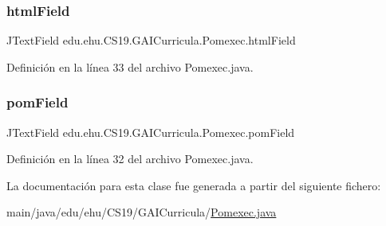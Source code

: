 \subsubsection{\texorpdfstring{htmlField}{htmlField}}
{\footnotesize\ttfamily J\+Text\+Field edu.\+ehu.\+C\+S19.\+G\+A\+I\+Curricula.\+Pomexec.\+html\+Field\hspace{0.3cm}{\ttfamily [private]}}



Definición en la línea 33 del archivo Pomexec.\+java.

\mbox{\label{classedu_1_1ehu_1_1_c_s19_1_1_g_a_i_curricula_1_1_pomexec_a7ea71ef0b61fa8df0b1689d11ce167cf}} 
\subsubsection{\texorpdfstring{pomField}{pomField}}
{\footnotesize\ttfamily J\+Text\+Field edu.\+ehu.\+C\+S19.\+G\+A\+I\+Curricula.\+Pomexec.\+pom\+Field\hspace{0.3cm}{\ttfamily [private]}}



Definición en la línea 32 del archivo Pomexec.\+java.



La documentación para esta clase fue generada a partir del siguiente fichero\+:\begin{DoxyCompactItemize}
\item 
main/java/edu/ehu/\+C\+S19/\+G\+A\+I\+Curricula/\mbox{\hyperlink{_pomexec_8java}{Pomexec.\+java}}\end{DoxyCompactItemize}
